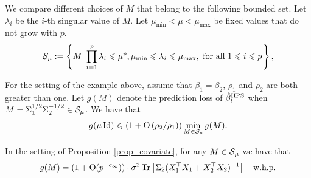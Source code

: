 We compare different choices of $M$ that belong to the following bounded set.
Let $\lambda_i$ be the $i$-th singular value of $M$.
Let $\mu_{\min} < \mu < \mu_{\max}$ be fixed values that do not grow with $p$.
{\begin{align*}
		\cS_{\mu}\define\bigset{M \left| \prod_{i=1}^p \lambda_i \le \mu^p, \mu_{\min} \le \lambda_i\le \mu_{\max}, \text{ for all } 1\le i\le p\right.},
\end{align*}}
\begin{proposition}\label{prop_covariate}
	For the setting of the example above, assume that $\beta_1 = \beta_2$, $\rho_1$ and $\rho_2$ are both greater than one.
	Let $g(M)$ denote the prediction loss of $\hat{\beta}_t^{\MTL}$ when $M = \Sigma_1^{1/2}\Sigma_2^{-1/2} \in\cS_{\mu}$.
	We have that
		\[ g(\mu\id) \le \bigbrace{1+ \bigo{{\rho_2}/{\rho_1}  }} \min_{M\in\cS_{\mu}} g(M). \]
\end{proposition}


\iffalse

 \begin{claim}\label{claim_covar_shift}
		In the setting of Proposition \ref{prop_covariate}, for any $M\in \cal S_\mu$ we have that
		\[ g(M)=(1+\OO(p^{-\e}))\cdot \sigma^2  \bigtr{\Sigma_2(X_1^{\top}X_1  + X_2^{\top}X_2)^{-1} }  \quad \text{w.h.p.} \]
	\end{claim}


